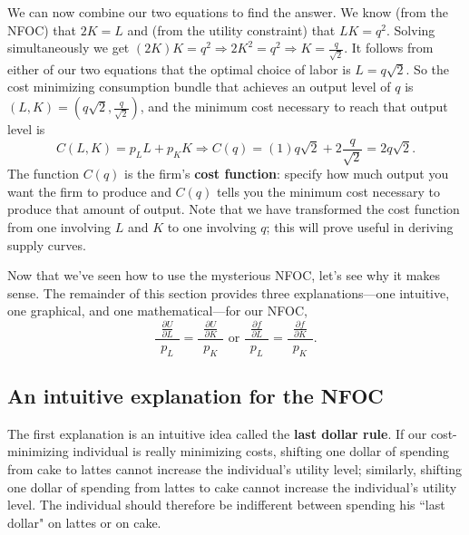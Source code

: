 We can now combine our two equations to find the answer. We know (from the NFOC) that $2K=L$ and (from the utility constraint) that $LK=q^2$. Solving simultaneously we get $(2K)K=q^2\Longrightarrow 2K^2=q^2\Longrightarrow K=\displaystyle\frac{q}{\sqrt{2}}$. It follows from either of our two equations that the optimal choice of labor is $L=q\sqrt{2}$. So the cost minimizing consumption bundle that achieves an output level of $q$ is $(L, K)=\left(q\sqrt{2}, \displaystyle\frac{q}{\sqrt{2}}\right)$, and the minimum cost necessary to reach that output level is
\[
C(L, K) = p_L L + p_K K \Longrightarrow C(q) =
(1)q\sqrt{2}+2\frac{q}{\sqrt{2}}=2q\sqrt{2}.
\]
The function $C(q)$ is the firm's \textbf{cost function}: specify how much output you want the firm to produce and $C(q)$ tells you the minimum cost necessary to produce that amount of output. Note that we have transformed the cost function from one involving $L$ and $K$ to one involving $q$; this will prove useful in deriving supply curves.

Now that we've seen how to use the mysterious NFOC, let's see why it makes sense. The remainder of this section provides three explanations---one intuitive, one graphical, and one mathematical---for our NFOC,
\[
\frac{\ \ \frac{\partial U}{\partial L}\ \ }{p_L}=\frac{\ \
\frac{\partial U}{\partial K}\ \ }{p_K} \mbox{\ \ or \ \ } \frac{\
\ \frac{\partial f}{\partial L}\ \ }{p_L}=\frac{\ \ \frac{\partial
f}{\partial K}\ \ }{p_K}.
\]


\subsection*{An intuitive explanation for the NFOC}

The first explanation is an intuitive idea called the \textbf{last dollar rule}. If our cost-minimizing individual is really minimizing costs, shifting one dollar of spending from cake to lattes cannot increase the individual's utility level; similarly, shifting one dollar of spending from lattes to cake cannot increase the individual's utility level. The individual should therefore be indifferent between spending his ``last dollar" on lattes or on cake.

